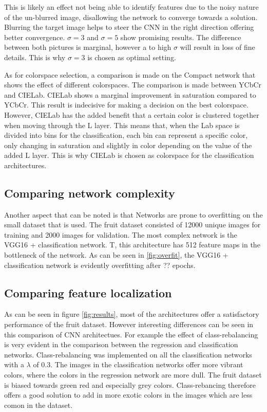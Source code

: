 {\color{red}
This is likely an effect not being able to identify features due to the noisy nature of the un-blurred image, disallowing the network to converge towards a solution. Blurring the target image helps to steer the CNN in the right direction offering better convergence. $\sigma = 3$ and $\sigma = 5$ show promising results. The difference between both pictures is marginal, however a to high $\sigma$ will result in loss of fine details. This is why $\sigma = 3$ is chosen as optimal setting.}

As for colorspace selection, a comparison is made on the Compact network that shows the effect of different colorspaces. The comparison is made between YCbCr and CIELab. CIELab shows a marginal improvement in saturation compared to YCbCr. This result is indecisive for making a decision on the best colorspace. However, CIELab has the added benefit that a certain color is clustered together when moving through the L layer. This means that, when the Lab space is divided into bins for the classification, each bin can represent a specific color, only changing in saturation and slightly in color depending on the value of the added L layer. This is why CIELab is chosen as colorspace for the classification architectures.


\subsection{Comparing network complexity}
Another aspect that can be noted is that Networks are prone to overfitting on the small dataset that is used. The fruit dataset consisted of 12000 unique images for training and 2000 images for validation. The most complex network is the VGG16 + classification network. T, this architecture has 512 feature maps in the bottleneck of the network. As can be seen in \ref{fig:overfit}, the VGG16 + classification network is evidently overfitting after ?? epochs. 

\subsection{Comparing feature localization}
As can be seen in figure \ref{fig:results}, most of the architectures offer a satisfactory performance of the fruit dataset. However interesting differences can be seen in this comparison of CNN architectues. For example the effect of class-rebalancing is very evident in the comparison between the regression and classification networks. Class-rebalancing was implemented on all the classification networks with a $\lambda$ of 0.3. The images in the classification networks offer more vibrant colors, where the colors in the regression network are more dull. The fruit dataset is biased towards green red and especially grey colors. Class-rebancing therefore offers a good solution to add in more exotic colors in the images which are less comon in the dataset.

